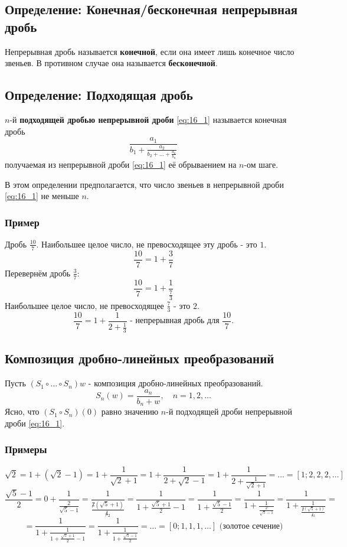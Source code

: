 \documentclass{article}
\begin{document}
\subsection{Определение: Конечная/бесконечная непрерывная дробь}
Непрерывная дробь называется \textbf{конечной}, если она имеет лишь конечное число звеньев. В противном случае она называется \textbf{бесконечной}.

\subsection{Определение: Подходящая дробь}
$n$-й \textbf{подходящей дробью непрерывной дроби} \eqref{eq:16_1} называется конечная дробь
\[\frac{a_1}{b_1 + \frac{a_2}{b_2 + \dots + \frac{a_n}{b_n}}}\]
получаемая из непрерывной дроби \eqref{eq:16_1} её обрываением на $n$-ом шаге.

В этом определении предполагается, что число звеньев в непрерывной дроби \eqref{eq:16_1} не меньше $n$.
\subsubsection*{Пример}
Дробь $\frac{10}{7}$. Наибольшее целое число, не превосходящее эту дробь - это $1$.
\[\frac{10}{7} = 1 + \frac{3}{7}\]
Перевернём дробь $\frac{3}{7}$:
\[\frac{10}{7} = 1 + \frac{1}{\frac{7}{3}}\]
Наибольшее целое число, не превосходящее $\frac{7}{3}$ - это $2$.
\[\frac{10}{7} = 1 + \frac{1}{2 + \frac{1}{3}} \text{ - непрерывная дробь для } \frac{10}{7}.\]

\subsection{Композиция дробно-линейных преобразований}
Пусть $(S_1 \circ \dots \circ S_n)w$ - композиция дробно-линейных преобразований.
\[S_n(w) = \frac{a_n}{b_n + w}, \quad n = 1, 2, \dots\]
Ясно, что $(S_1 \circ S_n)(0)$ равно значению $n$-й подходящей дроби непрерывной дроби \eqref{eq:16_1}.

\subsubsection*{Примеры}
\[\sqrt{2} = 1 + (\sqrt{2} - 1) = 1 + \frac{1}{\sqrt{2} + 1} = 1 + \frac{1}{2 + \sqrt{2} - 1} = 1 + \frac{1}{2 + \frac{1}{\sqrt{2} + 1}} = \dots = \left[1; 2, 2, 2, \dots\right]\]
\[\frac{\sqrt{5} - 1}{2} = 0 + \frac{1}{\frac{2}{\sqrt{5} - 1}} = \frac{1}{\frac{\not 2 (\sqrt{5} + 1)}{\not 4 {}_2}} = \frac{1}{1 + \frac{\sqrt{5}+1}{2} - 1} = \frac{1}{1 + \frac{\sqrt{5} - 1}{2}} = \frac{1}{1 + \frac{1}{\frac{2}{\sqrt{5} - 1}}} = \frac{1}{1 + \frac{1}{\frac{\not 2 (\sqrt{5} + 1)}{\not 4 {}_2}}} =\]
\[= \frac{1}{1 + \frac{1}{1 + \frac{\sqrt{5}+1}{2} - 1}} = \frac{1}{1 + \frac{1}{1 + \frac{\sqrt{5} - 1}{2}}} = \dots = \left[0; 1, 1, 1, \dots\right] \text{ (золотое сечение)}\]
\end{document}
